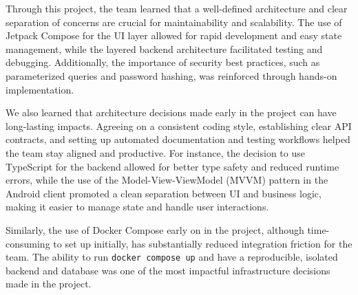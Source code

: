 Through this project, the team learned that a well-defined architecture and clear separation of concerns are crucial for maintainability and scalability. The use of Jetpack Compose for the UI layer allowed for rapid development and easy state management, while the layered backend architecture facilitated testing and debugging. Additionally, the importance of security best practices, such as parameterized queries and password hashing, was reinforced through hands-on implementation.

We also learned that architecture decisions made early in the project can have long-lasting impacts. Agreeing on a consistent coding style, establishing clear API contracts, and setting up automated documentation and testing workflows helped the team stay aligned and productive. For instance, the decision to use TypeScript for the backend allowed for better type safety and reduced runtime errors, while the use of the Model-View-ViewModel (MVVM) pattern in the Android client promoted a clean separation between UI and business logic, making it easier to manage state and handle user interactions.

Similarly, the use of Docker Compose early on in the project, although time-consuming to set up initially, has substantially reduced integration friction for the team. The ability to run \texttt{docker compose up} and have a reproducible, isolated backend and database was one of the most impactful infrastructure decisions made in the project.
